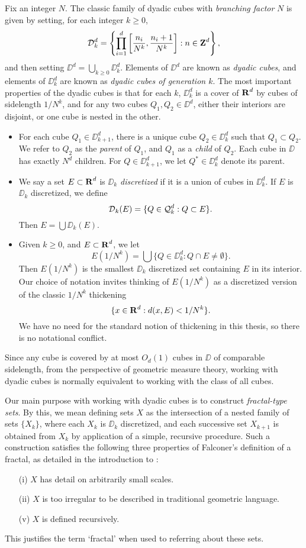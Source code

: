 Fix an integer $N$. The classic family of dyadic cubes with \emph{branching factor} $N$ is given by setting, for each integer $k \geq 0$,
%
\[ \operatorname{\mathcal{D}}_k^d = \left\{ \prod_{i = 1}^d \left[ \frac{n_i}{N^k}, \frac{n_i + 1}{N^k} \right] : n \in \operatorname{\mathbf{Z}}^d \right\}, \]
%
and then setting $\DD^d = \bigcup_{k \geq 0} \DD_k^d$. Elements of $\DD^d$ are known as \emph{dyadic cubes}, and elements of $\DD_k^d$ are known as \emph{dyadic cubes of generation $k$}. The most important properties of the dyadic cubes is that for each $k$, $\DD_k^d$ is a cover of $\operatorname{\mathbf{R}}^d$ by cubes of sidelength $1/N^k$, and for any two cubes $Q_1,Q_2 \in \DD^d$, either their interiors are disjoint, or one cube is nested in the other.
%
\begin{itemize}
	\item For each cube $Q_1 \in \DD_{k+1}^d$, there is a unique cube $Q_2 \in \DD_k^d$ such that $Q_1 \subset Q_2$. We refer to $Q_2$ as the \emph{parent} of $Q_1$, and $Q_1$ as a \emph{child} of $Q_2$. Each cube in $\DD$ has exactly $N^d$ children. For $Q \in \DD_{k+1}^d$, we let $Q^* \in \DD_k^d$ denote its parent.

	\item We say a set $E \subset \operatorname{\mathbf{R}}^d$ is \emph{$\DD_k$ discretized} if it is a union of cubes in $\DD_k^d$. If $E$ is $\DD_k$ discretized, we define
	\[ \operatorname{\mathcal{D}}_k(E) = \{ Q \in \operatorname{\mathcal{Q}}_k^d : Q \subset E \}. \]
	Then $E = \bigcup \DD_k(E)$.

	\item Given $k \geq 0$, and $E \subset \operatorname{\mathbf{R}}^d$, we let
	\[ E(1/N^k) = \bigcup \{ Q \in \DD_k^d : Q \cap E \neq \emptyset \}. \]
	Then $E(1/N^k)$ is the smallest $\DD_k$ discretized set containing $E$ in its interior. Our choice of notation invites thinking of $E(1/N^k)$ as a discretized version of the classic $1/N^k$ thickening
	\[ \{ x \in \operatorname{\mathbf{R}}^d : d(x,E) < 1/N^k \}. \]
	We have no need for the standard notion of thickening in this thesis, so there is no notational conflict.
\end{itemize}
%
Since any cube is covered by at most $O_d(1)$ cubes in $\DD$ of comparable sidelength, from the perspective of geometric measure theory, working with dyadic cubes is normally equivalent to working with the class of all cubes.

Our main purpose with working with dyadic cubes is to construct \emph{fractal-type sets}. By this, we mean defining sets $X$ as the intersection of a nested family of sets $\{ X_k \}$, where each $X_k$ is $\DD_k$ discretized, and each successive set $X_{k+1}$ is obtained from $X_k$ by application of a simple, recursive procedure. Such a construction satisfies the following three properties of Falconer's definition of a fractal, as detailed in the introduction to \cite{Falconer}:
%
\begin{itemize}
	\item[(i)] $X$ has detail on arbitrarily small scales.
	\item[(ii)] $X$ is too irregular to be described in traditional geometric language.
	\item[(v)] $X$ is defined recursively.
\end{itemize}
%
This justifies the term `fractal' when used to referring about these sets.

